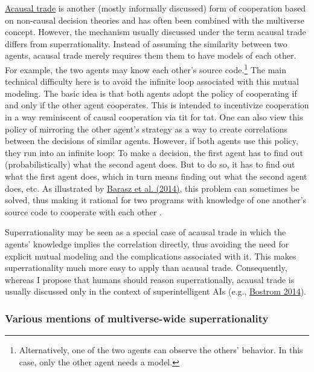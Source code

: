 \href{https://wiki.lesswrong.com/wiki/Acausal_trade}{Acausal
trade} is another (mostly informally discussed) form of cooperation
based on non-causal decision theories and has often been combined with
the multiverse concept. However, the mechanism usually discussed under
the term acausal trade differs from superrationality. Instead of
assuming the similarity between two agents, acausal trade merely
requires them them to have models of each other. For example, the two
agents may know each other's source code.\footnote{Alternatively, one of
  the two agents can observe the others' behavior. In this case, only
  the other agent needs a model.} The main technical difficulty here is
to avoid the infinite loop associated with this mutual modeling. The
basic idea is that both agents adopt the policy of cooperating if and
only if the other agent cooperates. This is intended to incentivize
cooperation in a way reminiscent of causal cooperation via tit for tat.
One can also view this policy of mirroring the other agent's strategy as
a way to create correlations between the decisions of similar agents.
However, if both agents use this policy, they run into an infinite loop:
To make a decision, the first agent has to find out (probabilistically)
what the second agent does. But to do so, it has to find out what the
first agent does, which in turn means finding out what the second agent
does, etc. As illustrated by
\href{https://arxiv.org/abs/1401.5577}{Barasz et al. (2014)},
this problem can sometimes be solved, thus making it rational for two
programs with knowledge of one another's source code to cooperate with
each other \parencite{LaVictoire2014-sv,Critch2016-cx}.

Superrationality may be seen as a special case of acausal trade in which
the agents' knowledge implies the correlation directly, thus avoiding
the need for explicit mutual modeling and the complications associated
with it. This makes superrationality much more easy to apply than
acausal trade. Consequently, whereas I propose that humans should reason
superrationally, acausal trade is usually discussed only in the context
of superintelligent AIs (e.g.,
\href{http://www.nickbostrom.com/papers/porosity.pdf}{Bostrom
2014}).

\subsubsection{Various mentions of multiverse-wide
superrationality}\label{various-mentions-of-multiverse-wide-superrationality}

